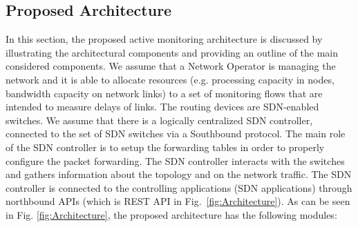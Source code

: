 \documentclass[10pt, journal, letterpaper]{IEEEtran}
\begin{document}
\subsection{Proposed Architecture}\label{subsec:Architecture}
In this section, the proposed active monitoring architecture is discussed by illustrating the architectural components and providing an outline of the main considered components. We assume that a Network Operator is managing the network and it is able to allocate resources (e.g. processing capacity in nodes, bandwidth capacity on network links) to a set of monitoring flows that are intended to measure delays of links. The routing devices are SDN-enabled switches. We assume that there is a logically centralized SDN controller, connected to the set of SDN switches via a Southbound protocol. The main role of the SDN controller is to setup the forwarding tables in order to properly configure the packet forwarding. The SDN controller interacts with the switches and gathers information about the topology and on the network traffic. The SDN controller is connected to the controlling applications (SDN applications) through northbound APIs (which is REST API in Fig.~\ref{fig:Architecture}). As can be seen in Fig. \ref{fig:Architecture}, the proposed architecture has the following modules: 
\end{document}
